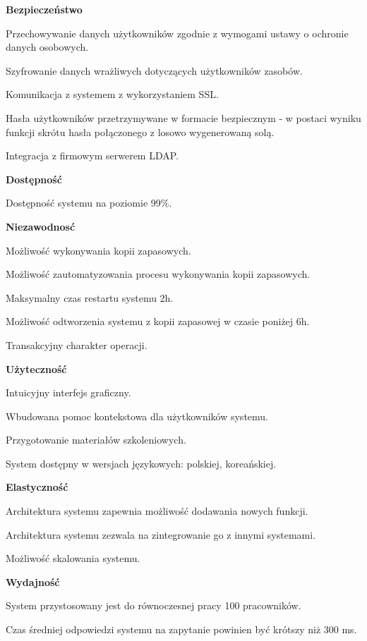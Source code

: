 \begin{myEnumerate}
	\item \textbf{Bezpieczeństwo}
	\begin{myEnumerate}
		\item Przechowywanie danych użytkowników zgodnie z wymogami ustawy o ochronie danych osobowych.
		\item Szyfrowanie danych wrażliwych dotyczących użytkowników zasobów.
		\item Komunikacja z systemem z wykorzystaniem SSL.
		\item Hasła użytkowników przetrzymywane w formacie bezpiecznym - w postaci wyniku funkcji skrótu hasła połączonego z losowo wygenerowaną solą.
		\item Integracja z firmowym serwerem LDAP.
	\end{myEnumerate}
	\item \textbf{Dostępność}
	\begin{myEnumerate}
		\item Dostępność systemu na poziomie 99\%.
	\end{myEnumerate}
	\item \textbf{Niezawodnosć}
	\begin{myEnumerate}
		\item Możliwość wykonywania kopii zapasowych.
		\item Możliwość zautomatyzowania procesu wykonywania kopii zapasowych.
		\item Maksymalny czas restartu systemu 2h.
		\item Możliwość odtworzenia systemu z kopii zapasowej w czasie poniżej 6h.
		\item Transakcyjny charakter operacji.
	\end{myEnumerate}
	\item \textbf{Użyteczność}
	\begin{myEnumerate}
		\item Intuicyjny interfejs graficzny.
		\item Wbudowana pomoc kontekstowa dla użytkowników systemu.
		\item Przygotowanie materiałów szkoleniowych.
		\item System dostępny w wersjach językowych: polskiej, koreańskiej.
	\end{myEnumerate}
	\item \textbf{Elastyczność}
	\begin{myEnumerate}
		\item Architektura systemu zapewnia możliwość dodawania nowych funkcji.
		\item Architektura systemu zezwala na zintegrowanie go z innymi systemami.
		\item Możliwość skalowania systemu.
	\end{myEnumerate}
	\item \textbf{Wydajność}
	\begin{myEnumerate}
		\item System przystosowany jest do równoczesnej pracy 100 pracowników.
		\item Czas średniej odpowiedzi systemu na zapytanie powinien być krótszy niż 300 ms.
	\end{myEnumerate}
\end{myEnumerate}

